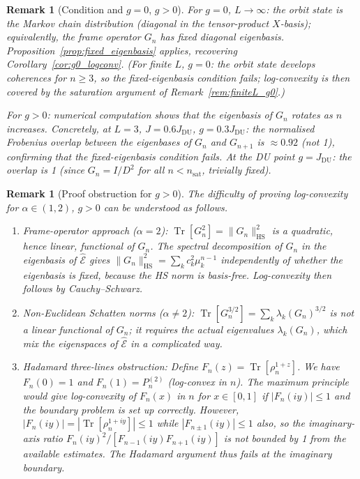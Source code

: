 \documentclass[12pt,a4paper]{article}
\newtheorem{remark}[theorem]{Remark}
\begin{document}
\begin{remark}[Condition and $g=0$, $g>0$]
For $g=0$, $L\to\infty$: the orbit state is the Markov chain distribution
(diagonal in the tensor-product $X$-basis); equivalently, the frame operator
$G_n$ has fixed diagonal eigenbasis.  Proposition~\ref{prop:fixed_eigenbasis}
applies, recovering Corollary~\ref{cor:g0_logconv}.
(For finite $L$, $g=0$: the orbit state develops coherences for $n\geq 3$,
so the fixed-eigenbasis condition fails; log-convexity is then covered by
the saturation argument of Remark~\ref{rem:finiteL_g0}.)

For $g>0$: numerical computation shows that the eigenbasis of $G_n$ rotates
as $n$ increases.  Concretely, at $L=3$, $J=0.6J_\mathrm{DU}$, $g=0.3J_\mathrm{DU}$:
the normalised Frobenius overlap between the eigenbases of $G_n$ and $G_{n+1}$
is $\approx0.92$ (not 1), confirming that the fixed-eigenbasis condition fails.
At the DU point $g=J_\mathrm{DU}$: the overlap is 1 (since $G_n=I/D^2$ for all
$n<n_\mathrm{sat}$, trivially fixed).
\end{remark}

\begin{remark}[Proof obstruction for $g>0$]
The difficulty of proving log-convexity for $\alpha\in(1,2)$, $g>0$ can be
understood as follows.
\begin{enumerate}
\item \emph{Frame-operator approach} ($\alpha=2$):
  $\operatorname{Tr}[G_n^2]=\|G_n\|_{\mathrm{HS}}^2$ is a quadratic, hence linear,
  functional of $G_n$.  The spectral decomposition of $G_n$ in the eigenbasis of
  $\hat{\mathcal{E}}$ gives $\|G_n\|_{\mathrm{HS}}^2=\sum_k c_k^2\mu_k^{n-1}$
  independently of whether the eigenbasis is fixed, because the HS norm is basis-free.
  Log-convexity then follows by Cauchy--Schwarz.
\item \emph{Non-Euclidean Schatten norms} ($\alpha\neq 2$):
  $\operatorname{Tr}[G_n^{3/2}]=\sum_k\lambda_k(G_n)^{3/2}$ is not a linear functional
  of $G_n$; it requires the actual eigenvalues $\lambda_k(G_n)$, which mix the
  eigenspaces of $\hat{\mathcal{E}}$ in a complicated way.
\item \emph{Hadamard three-lines obstruction}:
  Define $F_n(z)=\operatorname{Tr}[\rho_n^{1+z}]$.  We have $F_n(0)=1$ and
  $F_n(1)=P_n^{(2)}$ (log-convex in $n$).
  The maximum principle would give log-convexity of $F_n(x)$ in $n$ for $x\in[0,1]$
  if $|F_n(iy)|\leq1$ and the boundary problem is set up correctly.
  However, $|F_n(iy)|=|\operatorname{Tr}[\rho_n^{1+iy}]|\leq1$ while
  $|F_{n\pm1}(iy)|\leq1$ also, so the imaginary-axis ratio
  $F_n(iy)^2/[F_{n-1}(iy)F_{n+1}(iy)]$ is not bounded by 1
  from the available estimates.
  The Hadamard argument thus fails at the imaginary boundary.
\end{enumerate}
\end{remark}
\end{document}
